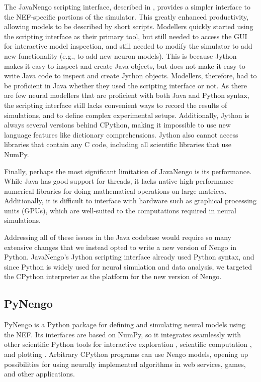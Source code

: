 \documentclass{frontiersSCNS}
\begin{document}
The JavaNengo scripting interface,
described in \citet{stewart2009},
provides a simpler interface
to the NEF-specific portions of the simulator.
This greatly enhanced productivity,
allowing models to be described
by short scripts.
Modellers quickly started using
the scripting interface
as their primary tool,
but still needed to access the GUI
for interactive model inspection,
and still needed to modify the simulator
to add new functionality
(e.g., to add new neuron models).
This is because Jython makes it easy
to inspect and create Java objects,
but does not make it easy to
write Java code to
inspect and create Jython objects.
Modellers, therefore, had to be
proficient in Java whether
they used the scripting interface or not.
As there are few neural modellers
that are proficient with both Java and Python syntax,
the scripting interface still lacks
convenient ways to record the results of simulations,
and to define complex experimental setups.
Additionally, Jython is always several versions
behind CPython, making it impossible
to use new language features
like dictionary comprehensions.
Jython also cannot access libraries
that contain any C code,
including all scientific libraries
that use NumPy.

Finally, perhaps the most significant limitation
of JavaNengo is its performance.
While Java has good support for threads,
it lacks native high-performance numerical libraries
for doing mathematical operations on large matrices.
Additionally, it is difficult to interface with
hardware such as graphical processing units (GPUs),
which are well-suited to the computations
required in neural simulations.

Addressing all of these issues
in the Java codebase would require
so many extensive changes
that we instead opted
to write a new version of Nengo in Python.
JavaNengo's Jython scripting interface
already used Python syntax,
and since Python is widely used
for neural simulation and data analysis,
we targeted the CPython interpreter
as the platform for the new version of Nengo.

\subsection{PyNengo}

PyNengo is a Python package for
defining and simulating
neural models using the NEF.
Its interfaces are based on NumPy,
so it integrates seamlessly
with other scientific Python tools
for interactive exploration \citep{perez2007},
scientific computation \citep{oliphant2007},
and plotting \citep{hunter2007}.
Arbitrary CPython programs
can use Nengo models,
opening up possibilities
for using neurally implemented algorithms
in web services, games, and other applications.
\end{document}
